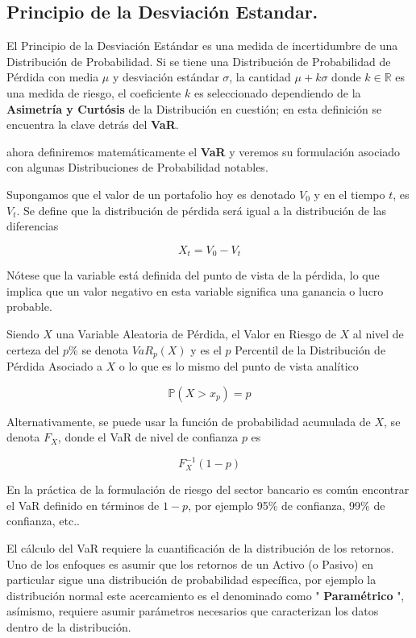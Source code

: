 \documentclass[]{article}
\begin{document}
\hypertarget{principio-de-la-desviacion-estandar.}{%
\subsection{\texorpdfstring{\textbf{Principio de la Desviación
Estandar.}}{Principio de la Desviación Estandar.}}\label{principio-de-la-desviacion-estandar.}}

El Principio de la Desviación Estándar es una medida de incertidumbre de
una Distribución de Probabilidad. Si se tiene una Distribución de
Probabilidad de Pérdida con media \(\mu\) y desviación estándar
\(\sigma\), la cantidad \(\mu+k\sigma\) donde \(k\in \mathbb{R}\) es una
medida de riesgo, el coeficiente \(k\) es seleccionado dependiendo de la
\textbf{Asimetría y Curtósis} de la Distribución en cuestión; en esta
definición se encuentra la clave detrás del \textbf{VaR}.

ahora definiremos matemáticamente el \textbf{VaR} y veremos su
formulación asociado con algunas Distribuciones de Probabilidad
notables.

Supongamos que el valor de un portafolio hoy es denotado \(V_0\) y en el
tiempo \(t\), es \(V_t\). Se define que la distribución de pérdida será
igual a la distribución de las diferencias

\[X_t = V_0 - V_t\]

Nótese que la variable está definida del punto de vista de la pérdida,
lo que implica que un valor negativo en esta variable significa una
ganancia o lucro probable.

Siendo \(X\) una Variable Aleatoria de Pérdida, el Valor en Riesgo de
\(X\) al nivel de certeza del \(p\)\% se denota \(VaR_{p}(X)\) y es el
\(p\) Percentil de la Distribución de Pérdida Asociado a \(X\) o lo que
es lo mismo del punto de vista analítico

\[\mathbb{P}(X>x_p)=p\]

Alternativamente, se puede usar la función de probabilidad acumulada de
\(X\), se denota \(F_X\), donde el VaR de nivel de confianza \(p\) es

\[F_{X}^{-1}(1-p)\]

En la práctica de la formulación de riesgo del sector bancario es común
encontrar el VaR definido en términos de \(1-p\), por ejemplo 95\% de
confianza, 99\% de confianza, etc..

El cálculo del VaR requiere la cuantificación de la distribución de los
retornos. Uno de los enfoques es asumir que los retornos de un Activo (o
Pasivo) en particular sigue una distribución de probabilidad específica,
por ejemplo la distribución normal este acercamiento es el denominado
como " \textbf{Paramétrico} ", asímismo, requiere asumir parámetros
necesarios que caracterizan los datos dentro de la distribución.
\end{document}

